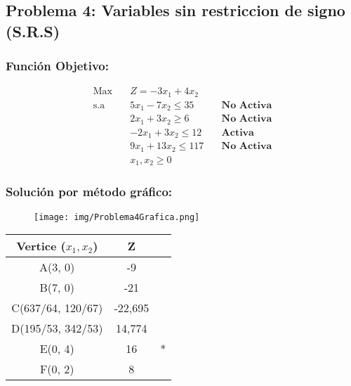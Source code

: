 \documentclass{templateNote}
\begin{document}
\newpage
\subsection*{Problema 4: Variables sin restriccion de signo (S.R.S)}
\subsubsection*{Función Objetivo:}
\begin{equation*}
    \begin{aligned}
        \text{Max} \quad & Z = -3x_1 + 4x_2 \\
        \text{s.a} \quad & 5x_1 - 7x_2 \leq 35 \quad &\textbf{No Activa} \\
        & 2x_1 + 3x_2 \geq 6 \quad &\textbf{No Activa} \\
        & -2x_1 + 3x_2 \leq 12 \quad &\textbf{Activa} \\
        & 9x_1 + 13x_2 \leq 117 \quad &\textbf{No Activa} \\
        & x_1, x_2 \geq 0
    \end{aligned}
\end{equation*}

\subsubsection*{Solución por método gráfico:}
\begin{figure}[H]
    \centering
    \texttt{[image: img/Problema4Grafica.png]}
\end{figure}

\begin{center}
    \begin{tabular}{|c|c|c|}
        \hline
        \textbf{Vertice ($x_1,x_2$)} & Z &  \\ \hline
        A(3, 0) & -9 & \\ \hline
        B(7, 0) & -21 & \\ \hline
        C(637/64, 120/67) & -22,695 & \\ \hline
        D(195/53, 342/53) & 14,774 & \\ \hline
        E(0, 4) & 16 & * \\ \hline
        F(0, 2) & 8 & \\ \hline
    \end{tabular}
\end{center}

\newpage
\end{document}
